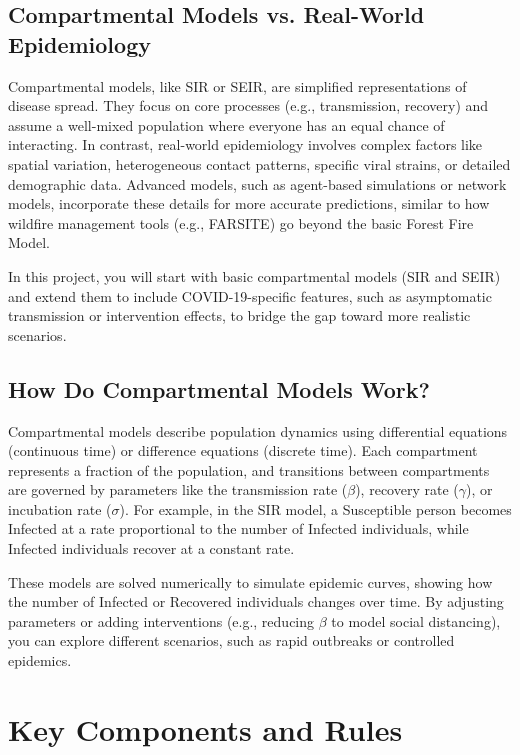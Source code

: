 \documentclass{article}
\begin{document}
\subsection{Compartmental Models vs. Real-World Epidemiology}

Compartmental models, like SIR or SEIR, are simplified representations of disease spread. They focus on core processes (e.g., transmission, recovery) and assume a well-mixed population where everyone has an equal chance of interacting. In contrast, real-world epidemiology involves complex factors like spatial variation, heterogeneous contact patterns, specific viral strains, or detailed demographic data. Advanced models, such as agent-based simulations or network models, incorporate these details for more accurate predictions, similar to how wildfire management tools (e.g., FARSITE) go beyond the basic Forest Fire Model.

In this project, you will start with basic compartmental models (SIR and SEIR) and extend them to include COVID-19-specific features, such as asymptomatic transmission or intervention effects, to bridge the gap toward more realistic scenarios.

\subsection{How Do Compartmental Models Work?}

Compartmental models describe population dynamics using differential equations (continuous time) or difference equations (discrete time). Each compartment represents a fraction of the population, and transitions between compartments are governed by parameters like the transmission rate ($\beta$), recovery rate ($\gamma$), or incubation rate ($\sigma$). For example, in the SIR model, a Susceptible person becomes Infected at a rate proportional to the number of Infected individuals, while Infected individuals recover at a constant rate.

These models are solved numerically to simulate epidemic curves, showing how the number of Infected or Recovered individuals changes over time. By adjusting parameters or adding interventions (e.g., reducing $\beta$ to model social distancing), you can explore different scenarios, such as rapid outbreaks or controlled epidemics.

\section{Key Components and Rules}
\end{document}
